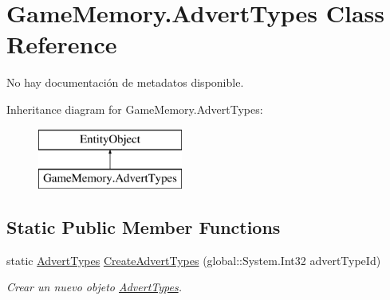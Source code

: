 \hypertarget{class_game_memory_1_1_advert_types}{\section{Game\-Memory.\-Advert\-Types Class Reference}
\label{class_game_memory_1_1_advert_types}
}


No hay documentación de metadatos disponible.  


Inheritance diagram for Game\-Memory.\-Advert\-Types\-:\begin{figure}[H]
\begin{center}
\leavevmode
\includegraphics[height=2.000000cm]{class_game_memory_1_1_advert_types}
\end{center}
\end{figure}
\subsection*{Static Public Member Functions}
\begin{DoxyCompactItemize}
\item 
static \hyperlink{class_game_memory_1_1_advert_types}{Advert\-Types} \hyperlink{class_game_memory_1_1_advert_types_a55bb5ec594393be2d7b4c47ae3282cb0}{Create\-Advert\-Types} (global\-::\-System.\-Int32 advert\-Type\-Id)
\begin{DoxyCompactList}\small\item\em Crear un nuevo objeto \hyperlink{class_game_memory_1_1_advert_types}{Advert\-Types}. \end{DoxyCompactList}\end{DoxyCompactItemize}
